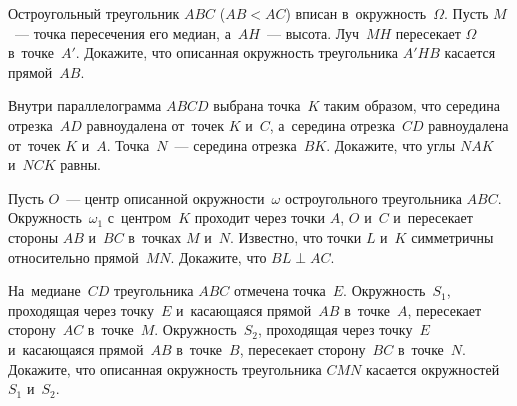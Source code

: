 \begin{problems}
\item
Остроугольный треугольник $ABC$ ($AB < AC$) вписан в~окружность~$\Omega$.
Пусть $M$~--- точка пересечения его медиан, а~$AH$~--- высота.
Луч~$MH$ пересекает $\Omega$ в~точке~$A'$.
Докажите, что описанная окружность треугольника $A'HB$ касается прямой~$AB$.

\item
Внутри параллелограмма $ABCD$ выбрана точка~$K$ таким образом, что середина
отрезка~$AD$ равноудалена от~точек $K$ и~$C$, а~середина отрезка~$CD$
равноудалена от~точек $K$ и~$A$.
Точка~$N$~--- середина отрезка~$BK$.
Докажите, что углы $NAK$ и~$NCK$ равны.

\item
Пусть $O$~--- центр описанной окружности~$\omega$ остроугольного
треугольника $ABC$.
Окружность~$\omega_{1}$ с~центром~$K$ проходит через точки $A$, $O$ и~$C$
и~пересекает стороны $AB$ и~$BC$ в~точках $M$ и~$N$.
Известно, что точки $L$ и~$K$ симметричны относительно прямой~$MN$.
Докажите, что $BL \perp AC$.

\item
На~медиане~$CD$ треугольника $ABC$ отмечена точка~$E$.
Окружность~$S_{1}$, проходящая через точку~$E$ и~касающаяся прямой~$AB$
в~точке~$A$, пересекает сторону~$AC$ в~точке~$M$.
Окружность~$S_{2}$, проходящая через точку~$E$ и~касающаяся прямой~$AB$
в~точке~$B$, пересекает сторону~$BC$ в~точке~$N$.
Докажите, что описанная окружность треугольника $CMN$ касается
окружностей $S_{1}$ и~$S_{2}$.

\end{problems}

